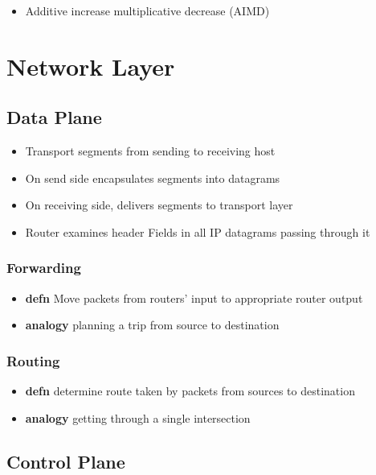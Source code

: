 \documentclass[11pt]{article}
\begin{document}
\begin{itemize}
\item Additive increase multiplicative decrease (AIMD)
\end{itemize}

\section{Network Layer}
\label{sec:org428f4d8}

\subsection{Data Plane}
\label{sec:orga56c44b}
\begin{itemize}
\item Transport segments from sending to receiving host
\item On send side encapsulates segments into datagrams
\item On receiving side, delivers segments to transport layer
\item Router examines header Fields in all IP datagrams passing through it
\end{itemize}

\subsubsection{Forwarding}
\label{sec:org553016d}
\begin{itemize}
\item \textbf{defn} Move packets from routers' input to appropriate router output
\item \textbf{analogy} planning a trip from source to destination
\end{itemize}

\subsubsection{Routing}
\label{sec:org9b61dcc}
\begin{itemize}
\item \textbf{defn} determine route taken by packets from sources to destination
\item \textbf{analogy} getting through a single intersection
\end{itemize}

\subsection{Control Plane}
\label{sec:org7ddc2a8}
\end{document}
